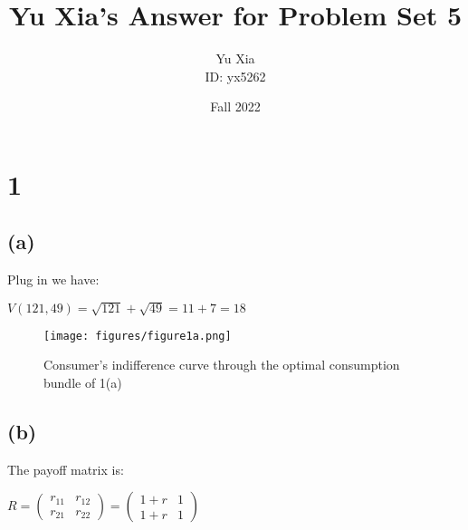 \documentclass{article}
\author{Yu Xia \\ ID: yx5262}
\title{Yu Xia's Answer for Problem Set 5}
\date{Fall 2022}
\begin{document}
\maketitle

\nocite{*}

\section*{1}

\subsection*{(a)}


Plug in we have: 

$\boxed{V(121, 49)=\sqrt{121}+\sqrt{49}=11+7=18}$

\begin{figure}[H]
    \begin{center}
        \texttt{[image: figures/figure1a.png]}
    \end{center}
    \caption{Consumer's indifference curve through the optimal consumption bundle of 1(a)}
    \label{fig:graph}
\end{figure}

\subsection*{(b)}

The payoff matrix is:

$R=\begin{pmatrix}
    r_{11} & r_{12} \\
    r_{21} & r_{22}
\end{pmatrix}=\begin{pmatrix}
    1+r & 1 \\
    1+r & 1
\end{pmatrix}$
\end{document}
